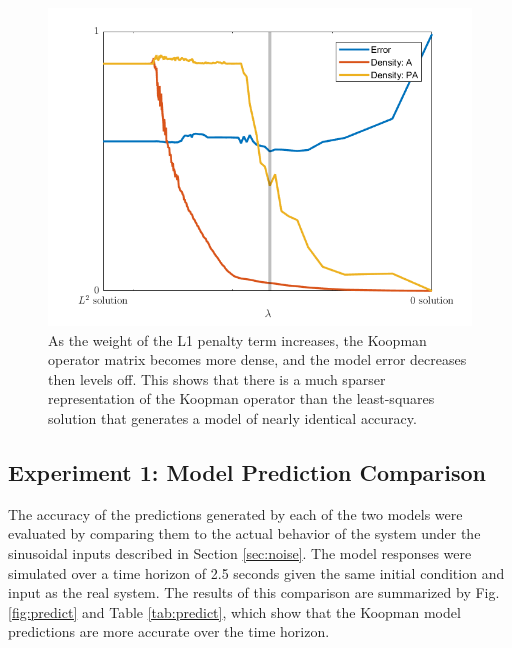 \begin{figure}
    \centering
    \includegraphics[width=\linewidth]{figures/lasso_ph.png}
    \caption{ As the weight of the L1 penalty term increases, the Koopman operator matrix becomes more dense, and the model error decreases then levels off. This shows that there is a much sparser representation of the Koopman operator than the least-squares solution that generates a model of nearly identical accuracy.}
    \label{fig:lasso}
\end{figure}


\subsection{Experiment 1: Model Prediction Comparison}
\label{sec:predict}

The accuracy of the predictions generated by each of the two models were evaluated by comparing them to the actual behavior of the system under the sinusoidal inputs described in Section \ref{sec:noise}.
The model responses were simulated over a time horizon of 2.5 seconds given the same initial condition and input as the real system.
The results of this comparison are summarized by Fig. \ref{fig:predict} and Table \ref{tab:predict}, which show that the Koopman model predictions are more accurate over the time horizon.

